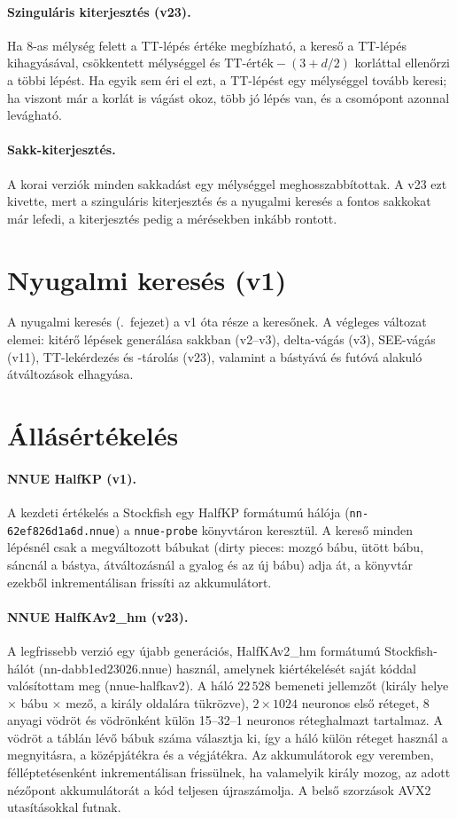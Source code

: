 \paragraph{Szinguláris kiterjesztés (v23).} Ha 8-as mélység felett a TT-lépés értéke megbízható, a kereső a TT-lépés kihagyásával, csökkentett mélységgel és $\text{TT-érték} - (3 + d/2)$ korláttal ellenőrzi a többi lépést. Ha egyik sem éri el ezt, a TT-lépést egy mélységgel tovább keresi; ha viszont már a korlát is vágást okoz, több jó lépés van, és a csomópont azonnal levágható.

\paragraph{Sakk-kiterjesztés.} A korai verziók minden sakkadást egy mélységgel meghosszabbítottak. A v23 ezt kivette, mert a szinguláris kiterjesztés és a nyugalmi keresés a fontos sakkokat már lefedi, a kiterjesztés pedig a mérésekben inkább rontott.

\section{Nyugalmi keresés (v1)}

A nyugalmi keresés (.~fejezet) a v1 óta része a keresőnek. A végleges változat elemei: kitérő lépések generálása sakkban (v2--v3), delta-vágás (v3), SEE-vágás (v11), TT-lekérdezés és -tárolás (v23), valamint a bástyává és futóvá alakuló átváltozások elhagyása.

\section{Állásértékelés}

\paragraph{NNUE HalfKP (v1).} A kezdeti értékelés a Stockfish egy HalfKP formátumú hálója (\texttt{nn-62ef826d1a6d.nnue}) a \texttt{nnue-probe} könyvtáron keresztül. A kereső minden lépésnél csak a megváltozott bábukat (dirty pieces: mozgó bábu, ütött bábu, sáncnál a bástya, átváltozásnál a gyalog és az új bábu) adja át, a könyvtár ezekből inkrementálisan frissíti az akkumulátort.

\paragraph{NNUE HalfKAv2\_hm (v23).} A legfrissebb verzió egy újabb generációs, HalfKAv2\_hm formátumú Stockfish-hálót (nn-dabb1ed23026.nnue) használ, amelynek kiértékelését saját kóddal valósítottam meg (nnue-halfkav2). A háló $22\,528$ bemeneti jellemzőt (király helye $\times$ bábu $\times$ mező, a király oldalára tükrözve), $2\times1024$ neuronos első réteget, 8 anyagi vödröt és vödrönként külön 15--32--1 neuronos réteghalmazt tartalmaz. A vödröt a táblán lévő bábuk száma választja ki, így a háló külön réteget használ a megnyitásra, a középjátékra és a végjátékra. Az akkumulátorok egy veremben, félléptetésenként inkrementálisan frissülnek, ha valamelyik király mozog, az adott nézőpont akkumulátorát a kód teljesen újraszámolja. A belső szorzások AVX2 utasításokkal futnak.

